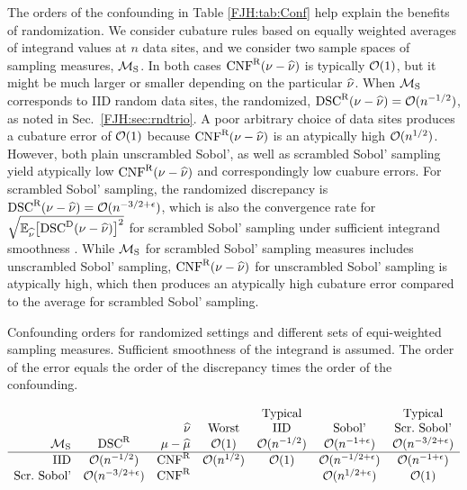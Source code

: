 \documentclass[graybox,footinfo]{svmult}
\DeclareMathOperator{\algn}{CNF}
\DeclareMathOperator{\disc}{DSC}
\begin{document}
The orders of the confounding in Table \ref{FJH:tab:Conf} help explain the 
benefits of randomization.  We consider cubature rules based on equally weighted 
averages of integrand values at $n$ data sites, and we consider two sample spaces of 
sampling measures, $\mathcal{M}_{\textup{S}}$.  In both cases $\algn^\Rn(\nu - \hnu)$ is 
typically $\mathcal{O}(1)$, but it might be much larger or smaller depending on the particular 
$\widehat{\nu}$.  When $\mathcal{M}_{\textup{S}}$ corresponds to IID random data sites, the 
randomized, $\disc^\Rn(\nu - \hnu) = \Order(n^{-1/2})$, as noted in Sec.\ 
\ref{FJH:sec:rndtrio}.  A poor 
arbitrary choice of data sites produces a cubature error of $\mathcal{O}(1)$ because 
$\algn^\Rn(\nu - \hnu)$ is an atypically high $\mathcal{O}(n^{1/2})$.  
However, both plain unscrambled Sobol', as well as scrambled Sobol' sampling yield 
atypically low $\algn^\Rn(\nu - \hnu)$ and correspondingly low cuabure errors.  For 
scrambled Sobol' sampling, the randomized discrepancy is $\disc^\Rn(\nu - \hnu) 
=\Order(n^{-3/2 + 
\epsilon})$, which is also the convergence rate for $\sqrt{\Ex_{\hnu}\bigl[\disc^\Dt(\nu - 
\hnu)\bigr ]^2}$ for scrambled 
Sobol' sampling under sufficient integrand smoothness \cite{HicHon98a, HicYue00}.
While $\mathcal{M}_{\textup{S}}$ for scrambled Sobol' sampling measures includes unscrambled 
Sobol' 
sampling, $\algn^\Rn(\nu - \hnu)$ for unscrambled Sobol' sampling is atypically high, 
which then produces an atypically high
cubature error compared to the average for scrambled Sobol' sampling.

\begin{table}
	\caption{Confounding orders for randomized settings and 
		different sets of equi-weighted 
		sampling measures. Sufficient smoothness of the integrand is assumed.
		The order of the error equals the order of the discrepancy times the 
		order of the confounding. \label{FJH:tab:Conf}}
	\begin{equation*}
	\begin{array}{r@{\quad }c@{\quad }r@{\quad}c@{\quad}c@{\quad}c@{\quad}c}
	&&&&\text{Typical} &&\text{Typical}\\
	\multicolumn{3}{r@{\quad}}{\hnu} &  \textup{Worst} &  \textup{IID} &
	\textup{Sobol'}&  \textup{Scr.\ Sobol'}\\
	\cm_{\textup{S}} & \disc^\Rn & \mu - \hmu & \Order(1) & \Order(n^{-1/2}) & 
	\Order(n^{-1+\epsilon}) & 
	\Order(n^{-3/2+\epsilon})\\
	\hline 
	\textup{IID} & \Order(n^{-1/2}) & \algn^\Rn & \Order(n^{1/2})  & \Order(1) 
	&\Order(n^{-1/2+\epsilon}) &\Order(n^{-1+\epsilon}) \\
	\textup{Scr.\ Sobol'} &\Order(n^{-3/2+\epsilon}) & \algn^\Rn 
	& & &\Order(n^{1/2+\epsilon})&\Order(1) 
	\end{array}
	\end{equation*}
\end{table}
\end{document}
